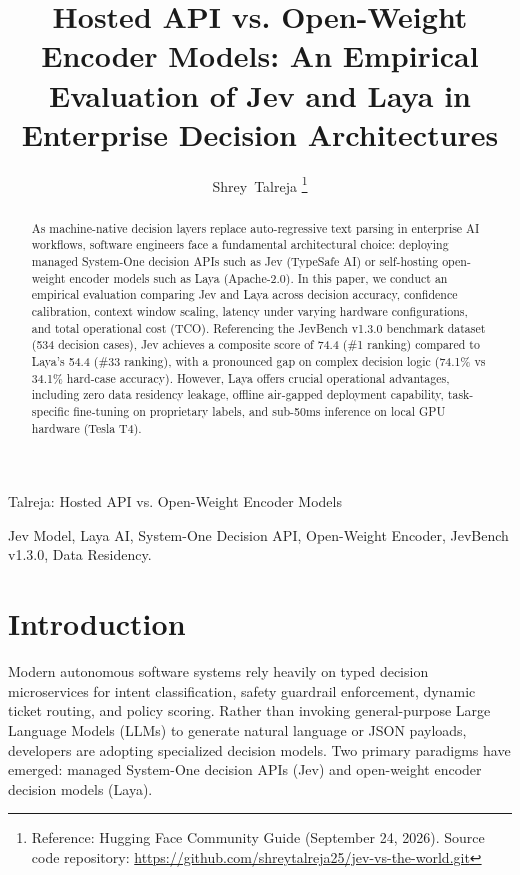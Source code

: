 \documentclass[10pt,journal,compsoc]{IEEEtran}
\begin{document}
\title{Hosted API vs. Open-Weight Encoder Models: An Empirical Evaluation of Jev and Laya in Enterprise Decision Architectures}

\author{Shrey~Talreja%
\thanks{Reference: Hugging Face Community Guide (September 24, 2026). Source code repository: \url{https://github.com/shreytalreja25/jev-vs-the-world.git}}}

%
{Talreja: Hosted API vs. Open-Weight Encoder Models}

\maketitle

\begin{abstract}
As machine-native decision layers replace auto-regressive text parsing in enterprise AI workflows, software engineers face a fundamental architectural choice: deploying managed System-One decision APIs such as Jev (TypeSafe AI) or self-hosting open-weight encoder models such as Laya (Apache-2.0). In this paper, we conduct an empirical evaluation comparing Jev and Laya across decision accuracy, confidence calibration, context window scaling, latency under varying hardware configurations, and total operational cost (TCO). Referencing the JevBench v1.3.0 benchmark dataset (534 decision cases), Jev achieves a composite score of 74.4 (\#1 ranking) compared to Laya's 54.4 (\#33 ranking), with a pronounced gap on complex decision logic (74.1\% vs 34.1\% hard-case accuracy). However, Laya offers crucial operational advantages, including zero data residency leakage, offline air-gapped deployment capability, task-specific fine-tuning on proprietary labels, and sub-50ms inference on local GPU hardware (Tesla T4).
\end{abstract}

\begin{IEEEkeywords}
Jev Model, Laya AI, System-One Decision API, Open-Weight Encoder, JevBench v1.3.0, Data Residency.
\end{IEEEkeywords}

\section{Introduction}
Modern autonomous software systems rely heavily on typed decision microservices for intent classification, safety guardrail enforcement, dynamic ticket routing, and policy scoring. Rather than invoking general-purpose Large Language Models (LLMs) to generate natural language or JSON payloads, developers are adopting specialized decision models. Two primary paradigms have emerged: managed System-One decision APIs (Jev) and open-weight encoder decision models (Laya).
\end{document}
